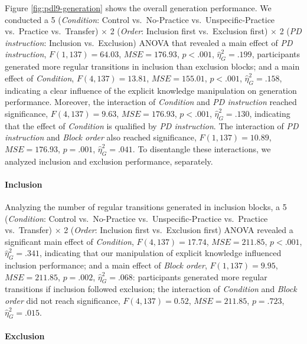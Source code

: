 \documentclass[english,,man]{apa6}
\begin{document}
Figure \ref{fig:pdl9-generation} shows the overall generation performance.
We conducted a 5 (\emph{Condition}: Control vs.~No-Practice vs.~Unspecific-Practice vs.~Practice vs.~Transfer) \(\times\) 2 (\emph{Order}: Inclusion first vs.~Exclusion first) \(\times\) 2 (\emph{PD instruction}: Inclusion vs.~Exclusion) ANOVA that revealed a main effect of \emph{PD instruction},
\(F(1, 137) = 64.03\), \(\mathit{MSE} = 176.93\), \(p < .001\), \(\hat{\eta}^2_G = .199\),
participants generated more regular transitions in inclusion than exclusion blocks;
and a main effect of \emph{Condition},
\(F(4, 137) = 13.81\), \(\mathit{MSE} = 155.01\), \(p < .001\), \(\hat{\eta}^2_G = .158\),
indicating a clear influence of the explicit knowledge manipulation on generation performance.
Moreover, the interaction of \emph{Condition} and \emph{PD instruction} reached significance,
\(F(4, 137) = 9.63\), \(\mathit{MSE} = 176.93\), \(p < .001\), \(\hat{\eta}^2_G = .130\),
indicating that the effect of \emph{Condition} is qualified by \emph{PD instruction}.
The interaction of \emph{PD instruction} and \emph{Block order} also reached significance,
\(F(1, 137) = 10.89\), \(\mathit{MSE} = 176.93\), \(p = .001\), \(\hat{\eta}^2_G = .041\).
To disentangle these interactions, we analyzed inclusion and exclusion performance, separately.

\hypertarget{inclusion}{%
\paragraph{Inclusion}\label{inclusion}}

Analyzing the number of regular transitions generated in inclusion blocks,
a 5 (\emph{Condition}: Control vs.~No-Practice vs.~Unspecific-Practice vs.~Practice vs.~Transfer) \(\times\) 2 (\emph{Order}: Inclusion first vs.~Exclusion first) ANOVA revealed a significant main effect of \emph{Condition},
\(F(4, 137) = 17.74\), \(\mathit{MSE} = 211.85\), \(p < .001\), \(\hat{\eta}^2_G = .341\),
indicating that our manipulation of explicit knowledge influenced inclusion performance;
and a main effect of \emph{Block order},
\(F(1, 137) = 9.95\), \(\mathit{MSE} = 211.85\), \(p = .002\), \(\hat{\eta}^2_G = .068\):
participants generated more regular transitions if inclusion followed exclusion;
the interaction of \emph{Condition} and \emph{Block order} did not reach significance,
\(F(4, 137) = 0.52\), \(\mathit{MSE} = 211.85\), \(p = .723\), \(\hat{\eta}^2_G = .015\).

\hypertarget{exclusion}{%
\paragraph{Exclusion}\label{exclusion}}
\end{document}
